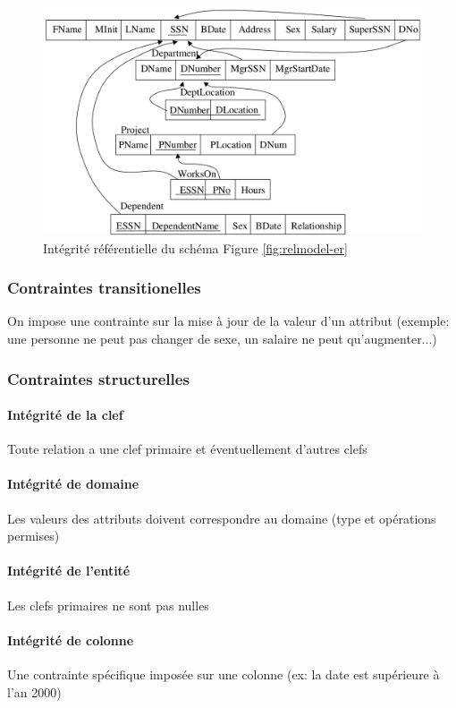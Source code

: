 \documentclass[a4paper]{article}
\begin{document}
\begin{figure}[h!]
    \center
    \includegraphics[width=.7\textwidth]{fig/integrite-rel.png}
    \caption{Intégrité référentielle du schéma Figure \ref{fig:relmodel-er}}
\end{figure}

\subsubsection{Contraintes transitionelles}
On impose une contrainte sur la mise à jour de la valeur d'un attribut (exemple:
une personne ne peut pas changer de sexe, un salaire ne peut qu'augmenter...)

\subsubsection{Contraintes structurelles}
\paragraph{Intégrité de la clef}
Toute relation a une clef primaire et éventuellement d'autres clefs

\paragraph{Intégrité de domaine}
Les valeurs des attributs doivent correspondre au domaine (type et opérations permises)

\paragraph{Intégrité de l'entité}
Les clefs primaires ne sont pas nulles

\paragraph{Intégrité de colonne}
Une contrainte spécifique imposée sur une colonne (ex: la date est supérieure à l'an 2000)
\end{document}
